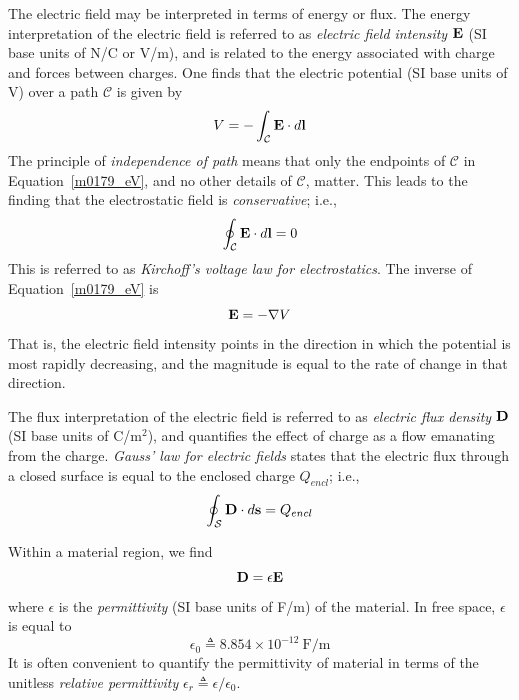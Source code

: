 The electric field may be interpreted in terms of energy or flux.
The energy interpretation of the electric field is referred to as \emph{electric field intensity} 
${\bf E}$ (SI base units of N/C or V/m), and is related to the energy associated with charge and forces between charges.
One finds that the electric potential (SI base units of V) over a path $\mathcal{C}$ is given by
%
\begin{equation}
V = -\int_{\mathcal{C}} {\bf E}\cdot d{\bf l}
\label{m0179_eV}
\end{equation}
%
The principle of \emph{independence of path} 
means that only the endpoints of $\mathcal{C}$ in Equation~\ref{m0179_eV}, and no other details of $\mathcal{C}$, matter. 
This leads to the finding that the electrostatic field is \emph{conservative}; i.e., 
%
\begin{equation}
\oint_{\mathcal{C}} {\bf E}\cdot d{\bf l} = 0
\label{m0179_mes1}
\end{equation}
%
This is referred to as \emph{Kirchoff's voltage law for electrostatics}.
%
The inverse of Equation~\ref{m0179_eV} is
%
\begin{equation}
{\bf E} = -\nabla V
\end{equation}
%
That is, the electric field intensity points in the direction in which the potential is most rapidly decreasing, and the magnitude is equal to the rate of change in that direction.

The flux interpretation of the electric field is referred to as \emph{electric flux density} 
${\bf D}$ (SI base units of C/m$^2$), and quantifies the effect of charge as a flow emanating from the charge.  
\emph{Gauss' law for electric fields} 
states that the electric flux through a closed surface is equal to the enclosed charge $Q_{encl}$; i.e., 
%
\begin{equation}
\oint_{\mathcal{S}} {\bf D}\cdot d{\bf s} = Q_{encl}
\label{m0179_mes2}
\end{equation}

Within a material region, we find
%
\begin{equation}
{\bf D} = \epsilon {\bf E}
\label{m0179_eED}
\end{equation}
%
where $\epsilon$ is the \emph{permittivity} 
(SI base units of F/m) of the material.
In free space, $\epsilon$ is equal to
%
\begin{equation}
\epsilon_0\triangleq 8.854 \times 10^{-12}~\mbox{F/m}
\end{equation}
%
It is often convenient to quantify the permittivity of material in terms of the unitless \emph{relative permittivity} 
$\epsilon_r\triangleq \epsilon/\epsilon_0$.


